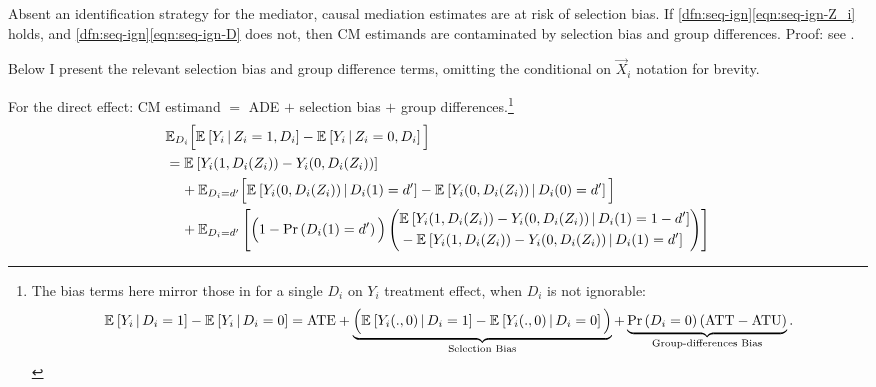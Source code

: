 \begin{theorem}
    \label{thm:selection-bias}
    Absent an identification strategy for the mediator, causal mediation estimates are at risk of selection bias.
    If \ref{dfn:seq-ign}\eqref{eqn:seq-ign-Z_i} holds, and \ref{dfn:seq-ign}\eqref{eqn:seq-ign-D} does not, then CM estimands are contaminated by selection bias and group differences.
    Proof: see .
\end{theorem}
Below I present the relevant selection bias and group difference terms, omitting the conditional on $\vec X_i$ notation for brevity.

\noindent
For the direct effect: CM estimand $=$ ADE $+$ selection bias $+$ group differences.\footnote{
    The bias terms here mirror those in \cite{heckman1998characterizing,angrist2009mostly} for a single $D_i$ on $Y_i$ treatment effect, when $D_i$ is not ignorable:
    \vspace{-0.25cm}
    \[ \Egiven{ Y_i}{D_i =1} - \Egiven{ Y_i}{D_i =0}
        = \text{ATE}
        + \underbrace{\Big( \Egiven{ Y_i(.,0)}{D_i =1} - \Egiven{ Y_i(.,0)}{D_i =0} \Big)}_{
            \text{Selection Bias}}
        + \underbrace{ \Prob{D_i=0} (\text{ATT} - \text{ATU}) }_{
            \text{Group-differences Bias}}. \]
}
\begin{align*}
    & \mathbb E_{D_i} \Big[
        \Egiven{Y_i}{Z_i = 1, D_i} - \Egiven{Y_i}{Z_i = 0, D_i} \Big] \\
    & = \E{Y_i(1, D_i(Z_i)) - Y_i(0, D_i(Z_i))} \\
    & \;\;\;\; + \mathbb E_{D_i = d'} \Big[
        \Egiven{Y_i(0, D_i(Z_i))}{D_i(1) = d'} 
        - \Egiven{Y_i(0, D_i(Z_i))}{D_i(0) = d'} \Big] \\
    & \;\;\;\; + \E[D_i = d']{
        \Big(1 - \Prob{D_i(1) = d'} \Big)
        \left( \begin{aligned}
            &\Egiven{Y_i(1, D_i(Z_i)) - Y_i(0, D_i(Z_i))}{D_i(1) = 1-d'} \\ 
            &  - \Egiven{Y_i(1, D_i(Z_i)) - Y_i(0, D_i(Z_i))}{D_i(1) = d'}
            \end{aligned} \right) }
\end{align*}

